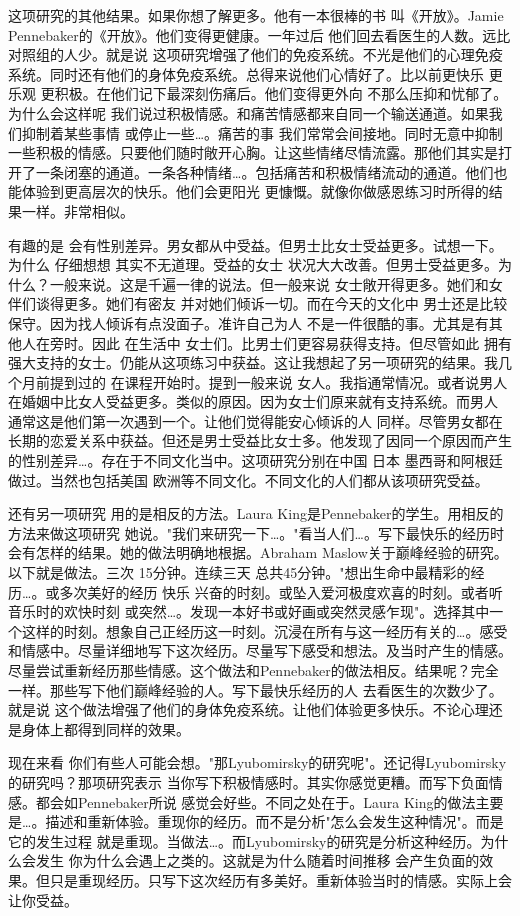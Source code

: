 这项研究的其他结果。如果你想了解更多。他有一本很棒的书 叫《开放》。Jamie Pennebaker的《开放》。他们变得更健康。一年过后 他们回去看医生的人数。远比对照组的人少。就是说 这项研究增强了他们的免疫系统。不光是他们的心理免疫系统。同时还有他们的身体免疫系统。总得来说他们心情好了。比以前更快乐 更乐观 更积极。在他们记下最深刻伤痛后。他们变得更外向 不那么压抑和忧郁了。为什么会这样呢 我们说过积极情感。和痛苦情感都来自同一个输送通道。如果我们抑制着某些事情 或停止一些…。痛苦的事 我们常常会间接地。同时无意中抑制一些积极的情感。只要他们随时敞开心胸。让这些情绪尽情流露。那他们其实是打开了一条闭塞的通道。一条各种情绪…。包括痛苦和积极情绪流动的通道。他们也能体验到更高层次的快乐。他们会更阳光 更慷慨。就像你做感恩练习时所得的结果一样。非常相似。 

有趣的是 会有性别差异。男女都从中受益。但男士比女士受益更多。试想一下。为什么 仔细想想 其实不无道理。受益的女士 状况大大改善。但男士受益更多。为什么？一般来说。这是千遍一律的说法。但一般来说 女士敞开得更多。她们和女伴们谈得更多。她们有密友 并对她们倾诉一切。而在今天的文化中 男士还是比较保守。因为找人倾诉有点没面子。准许自己为人 不是一件很酷的事。尤其是有其他人在旁时。因此 在生活中 女士们。比男士们更容易获得支持。但尽管如此 拥有强大支持的女士。仍能从这项练习中获益。这让我想起了另一项研究的结果。我几个月前提到过的 在课程开始时。提到一般来说 女人。我指通常情况。或者说男人 在婚姻中比女人受益更多。类似的原因。因为女士们原来就有支持系统。而男人 通常这是他们第一次遇到一个。让他们觉得能安心倾诉的人 同样。尽管男女都在长期的恋爱关系中获益。但还是男士受益比女士多。他发现了因同一个原因而产生的性别差异…。存在于不同文化当中。这项研究分别在中国 日本 墨西哥和阿根廷做过。当然也包括美国 欧洲等不同文化。不同文化的人们都从该项研究受益。 

还有另一项研究 用的是相反的方法。Laura King是Pennebaker的学生。用相反的方法来做这项研究 她说。"我们来研究一下…。"看当人们…。写下最快乐的经历时会有怎样的结果。她的做法明确地根据。Abraham Maslow关于巅峰经验的研究。以下就是做法。三次 15分钟。连续三天 总共45分钟。"想出生命中最精彩的经历…。或多次美好的经历 快乐 兴奋的时刻。或坠入爱河极度欢喜的时刻。或者听音乐时的欢快时刻 或突然…。发现一本好书或好画或突然灵感乍现"。选择其中一个这样的时刻。想象自己正经历这一时刻。沉浸在所有与这一经历有关的…。感受和情感中。尽量详细地写下这次经历。尽量写下感受和想法。及当时产生的情感。尽量尝试重新经历那些情感。这个做法和Pennebaker的做法相反。结果呢？完全一样。那些写下他们巅峰经验的人。写下最快乐经历的人 去看医生的次数少了。就是说 这个做法增强了他们的身体免疫系统。让他们体验更多快乐。不论心理还是身体上都得到同样的效果。 

现在来看 你们有些人可能会想。"那Lyubomirsky的研究呢"。还记得Lyubomirsky的研究吗？那项研究表示 当你写下积极情感时。其实你感觉更糟。而写下负面情感。都会如Pennebaker所说 感觉会好些。不同之处在于。Laura King的做法主要是…。描述和重新体验。重现你的经历。而不是分析"怎么会发生这种情况"。而是它的发生过程 就是重现。当做法…。而Lyubomirsky的研究是分析这种经历。为什么会发生 你为什么会遇上之类的。这就是为什么随着时间推移 会产生负面的效果。但只是重现经历。只写下这次经历有多美好。重新体验当时的情感。实际上会让你受益。 


